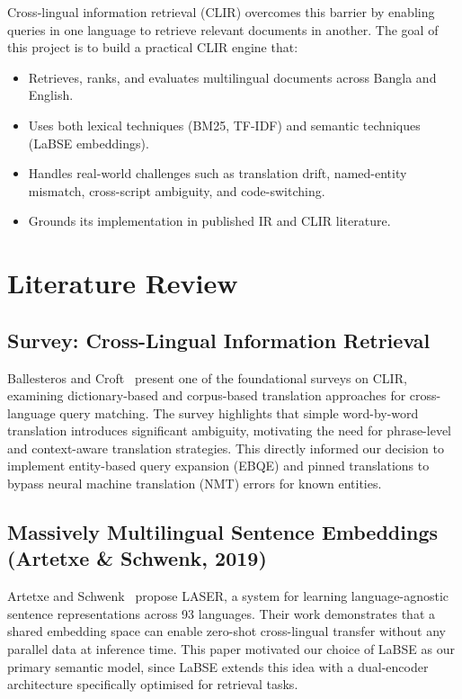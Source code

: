 \documentclass[12pt,a4paper]{article}
\begin{document}
Cross-lingual information retrieval (CLIR) overcomes this barrier by enabling queries in one language to retrieve relevant documents in another. The goal of this project is to build a practical CLIR engine that:

\begin{itemize}
    \item Retrieves, ranks, and evaluates multilingual documents across Bangla and English.
    \item Uses both lexical techniques (BM25, TF-IDF) and semantic techniques (LaBSE embeddings).
    \item Handles real-world challenges such as translation drift, named-entity mismatch, cross-script ambiguity, and code-switching.
    \item Grounds its implementation in published IR and CLIR literature.
\end{itemize}

\section{Literature Review}

\subsection{Survey: Cross-Lingual Information Retrieval}
Ballesteros and Croft~\cite{ballesteros1997} present one of the foundational surveys on CLIR, examining dictionary-based and corpus-based translation approaches for cross-language query matching. The survey highlights that simple word-by-word translation introduces significant ambiguity, motivating the need for phrase-level and context-aware translation strategies. This directly informed our decision to implement entity-based query expansion (EBQE) and pinned translations to bypass neural machine translation (NMT) errors for known entities.

\subsection{Massively Multilingual Sentence Embeddings (Artetxe \& Schwenk, 2019)}
Artetxe and Schwenk~\cite{artetxe2019} propose LASER, a system for learning language-agnostic sentence representations across 93 languages. Their work demonstrates that a shared embedding space can enable zero-shot cross-lingual transfer without any parallel data at inference time. This paper motivated our choice of LaBSE as our primary semantic model, since LaBSE extends this idea with a dual-encoder architecture specifically optimised for retrieval tasks.
\end{document}
